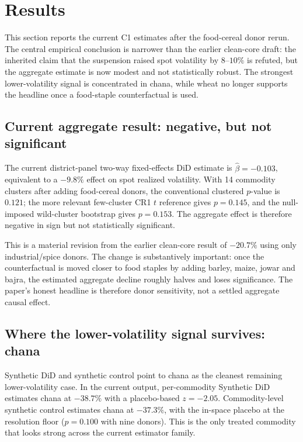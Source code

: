 \section{Results}
\label{sec:results}

This section reports the current C1 estimates after the food-cereal donor rerun. The
central empirical conclusion is narrower than the earlier clean-core draft: the inherited
claim that the suspension raised spot volatility by $8$--$10\%$ is refuted, but the
aggregate estimate is now modest and not statistically robust. The strongest lower-volatility
signal is concentrated in chana, while wheat no longer supports the headline once a food-staple
counterfactual is used.

\subsection{Current aggregate result: negative, but not significant}
\label{sec:results-aggregate}

The current district-panel two-way fixed-effects DiD estimate is
$\hat\beta=-0.103$, equivalent to a $-9.8\%$ effect on spot realized volatility. With
14 commodity clusters after adding food-cereal donors, the conventional clustered
$p$-value is $0.121$; the more relevant few-cluster CR1 $t$ reference gives
$p=0.145$, and the null-imposed wild-cluster bootstrap gives $p=0.153$. The aggregate
effect is therefore negative in sign but not statistically significant.

This is a material revision from the earlier clean-core result of $-20.7\%$
using only industrial/spice donors. The change is substantively important: once the
counterfactual is moved closer to food staples by adding barley, maize, jowar and
bajra, the estimated aggregate decline roughly halves and loses significance. The
paper's honest headline is therefore donor sensitivity, not a settled aggregate
causal effect.



\subsection{Where the lower-volatility signal survives: chana}
\label{sec:results-chana}

Synthetic DiD and synthetic control point to chana as the cleanest remaining
lower-volatility case. In the current output, per-commodity Synthetic DiD estimates
chana at $-38.7\%$ with a placebo-based $z=-2.05$. Commodity-level synthetic control
estimates chana at $-37.3\%$, with the in-space placebo at the resolution floor
($p=0.100$ with nine donors). This is the only treated commodity that looks strong
across the current estimator family.

